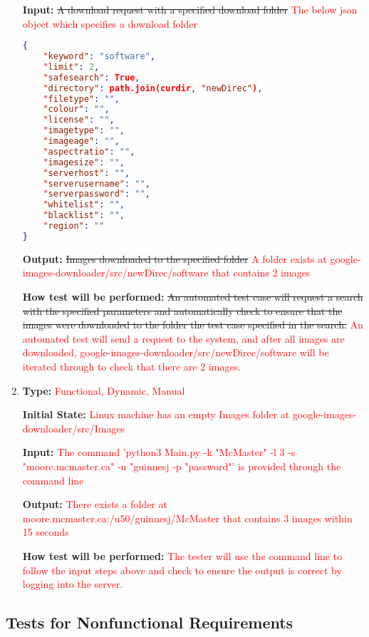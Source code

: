 \documentclass[12pt, titlepage]{article}
\begin{document}
\begin{enumerate}[label=FR-DL\arabic*:, wide=0pt, leftmargin=*]
\textbf{Input:} \sout{A download request with a specified download folder}
\textcolor{red}{The below json object which specifies a download folder}
\begin{lstlisting}[language=json,firstnumber=1]
{
    "keyword": "software",
    "limit": 2,
    "safesearch": True,
    "directory": path.join(curdir, "newDirec"),
    "filetype": "",
    "colour": "",
    "license": "",
    "imagetype": "",
    "imageage": "",
    "aspectratio": "",
    "imagesize": "",
    "serverhost": "",
    "serverusername": "",
    "serverpassword": "",
    "whitelist": "",
    "blacklist": "",
    "region": ""
}
\end{lstlisting}
					
\textbf{Output:} \sout{Images downloaded to the specified folder}
\textcolor{red}{A folder exists at google-images-downloader/src/newDirec/software that contains 2 images}
					
\textbf{How test will be performed:} \sout{An automated test case will request a search with the 
specified parameters and automatically check to ensure that the images were downloaded to 
the folder the test case specified in the search.}
\textcolor{red}{An automated test will send a request to the system, and after all images are downloaded, 
google-images-downloader/src/newDirec/software will be iterated through to check that there are 2 images.}

\item \phantom{empty}

\textbf{Type:} \textcolor{red}{Functional, Dynamic, Manual}

\textbf{Initial State:} \textcolor{red}{Linux machine has an empty Images folder at google-images-downloader/src/Images}

\textbf{Input:} \textcolor{red}{The command 'python3 Main.py -k "McMaster" -l 3 -s "moore.mcmaster.ca" -u "guinnesj -p "password"' 
is provided through the command line}

\textbf{Output:} \textcolor{red}{There exists a folder at moore.mcmaster.ca:/u50/guinnesj/McMaster that contains 3 images within 15 seconds}

\textbf{How test will be performed:} \textcolor{red}{The tester will use the command line to follow the input steps above and 
check to ensure the output is correct by logging into the server.}


\end{enumerate}


\subsection{Tests for Nonfunctional Requirements}
\end{document}
